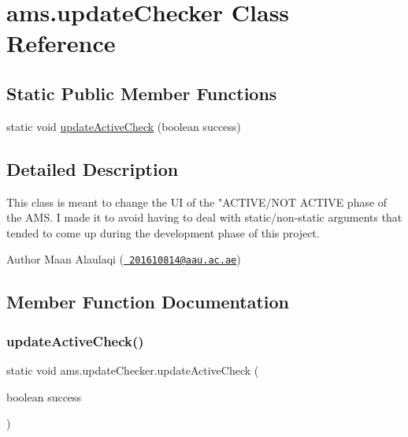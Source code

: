 \hypertarget{classams_1_1update_checker}{}\section{ams.\+update\+Checker Class Reference}
\label{classams_1_1update_checker}
\subsection*{Static Public Member Functions}
\begin{DoxyCompactItemize}
\item 
static void \mbox{\hyperlink{classams_1_1update_checker_af796e0298f9cc7abd088f9012c54a33f}{update\+Active\+Check}} (boolean success)
\end{DoxyCompactItemize}


\subsection{Detailed Description}
This class is meant to change the UI of the "A\+C\+T\+I\+V\+E/\+N\+OT A\+C\+T\+I\+VE phase of the A\+MS. I made it to avoid having to deal with static/non-\/static arguments that tended to come up during the development phase of this project. \begin{DoxyAuthor}{Author}
Maan Alaulaqi (\href{mailto:201610814@aau.ac.ae}{\texttt{ 201610814@aau.\+ac.\+ae}}) 
\end{DoxyAuthor}


\subsection{Member Function Documentation}
\mbox{\label{classams_1_1update_checker_af796e0298f9cc7abd088f9012c54a33f}} 
\subsubsection{\texorpdfstring{updateActiveCheck()}{updateActiveCheck()}}
{\footnotesize\ttfamily static void ams.\+update\+Checker.\+update\+Active\+Check (\begin{DoxyParamCaption}\item[{boolean}]{success }\end{DoxyParamCaption})\hspace{0.3cm}{\ttfamily [static]}}

